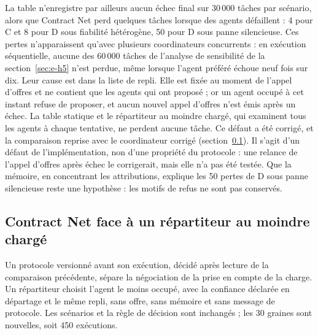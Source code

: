La table n'enregistre par ailleurs aucun échec final sur $30\,000$ tâches par scénario, alors que Contract Net perd quelques tâches lorsque des agents défaillent : 4 pour C et 8 pour D sous fiabilité hétérogène, 50 pour D sous panne silencieuse. Ces pertes n'apparaissent qu'avec plusieurs coordinateurs concurrents : en exécution séquentielle, aucune des $60\,000$ tâches de l'analyse de sensibilité de la section~\ref{sec:e-h5} n'est perdue, même lorsque l'agent préféré échoue neuf fois sur dix. Leur cause est dans la liste de repli. Elle est fixée au moment de l'appel d'offres et ne contient que les agents qui ont proposé ; or un agent occupé à cet instant refuse de proposer, et aucun nouvel appel d'offres n'est émis après un échec. La table statique et le répartiteur au moindre chargé, qui examinent tous les agents à chaque tentative, ne perdent aucune tâche. Ce défaut a été corrigé, et la comparaison reprise avec le coordinateur corrigé (section~\ref{sec:e-cnp-moindre}). Il s'agit d'un défaut de l'implémentation, non d'une propriété du protocole : une relance de l'appel d'offres après échec le corrigerait, mais elle n'a pas été testée. Que la mémoire, en concentrant les attributions, explique les 50 pertes de D sous panne silencieuse reste une hypothèse : les motifs de refus ne sont pas conservés.

\subsection{Contract Net face à un répartiteur au moindre chargé}
\label{sec:e-cnp-moindre}

Un protocole versionné avant son exécution, décidé après lecture de la comparaison précédente, sépare la négociation de la prise en compte de la charge. Un répartiteur choisit l'agent le moins occupé, avec la confiance déclarée en départage et le même repli, sans offre, sans mémoire et sans message de protocole. Les scénarios et la règle de décision sont inchangés ; les 30 graines sont nouvelles, soit 450 exécutions.

